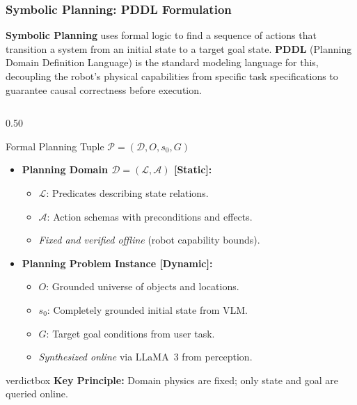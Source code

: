 \documentclass[10pt]{beamer}
\begin{document}
\begin{frame}[t]
\frametitle{Symbolic Planning: PDDL Formulation}
\footnotesize
\textbf{Symbolic Planning} uses formal logic to find a sequence of actions that transition a system from an initial state to a target goal state. \textbf{PDDL} (Planning Domain Definition Language) is the standard modeling language for this, decoupling the robot's physical capabilities from specific task specifications to guarantee causal correctness before execution.

\vspace{0.15cm}
\begin{columns}[T]
        \begin{column}{0.50\textwidth}
        \begin{block}{Formal Planning Tuple $\mathcal{P} = (\mathcal{D}, O, s_0, G)$}
            \begin{itemize}\scriptsize
                \item \textbf{Planning Domain $\mathcal{D} = (\mathcal{L}, \mathcal{A})$ [Static]:}
                \begin{itemize}\tiny
                    \item $\mathcal{L}$: Predicates describing state relations.
                    \item $\mathcal{A}$: Action schemas with preconditions and effects.
                    \item \textit{Fixed and verified offline} (robot capability bounds).
                \end{itemize}
                \vspace{0.06cm}
                \item \textbf{Planning Problem Instance [Dynamic]:}
                \begin{itemize}\tiny
                    \item $O$: Grounded universe of objects and locations.
                    \item $s_0$: Completely grounded initial state from VLM.
                    \item $G$: Target goal conditions from user task.
                    \item \textit{Synthesized online} via LLaMA~3 from perception.
                \end{itemize}
            \end{itemize}
        \end{block}
        
        \vspace{0.12cm}
        \begin{beamercolorbox}[sep=4pt,center,shadow=true,rounded=true]{verdictbox}
            \tiny \textbf{Key Principle:} Domain physics are fixed; only state and goal are queried online.
        \end{beamercolorbox}
    \end{column}
    

\end{columns}
\end{frame}
\end{document}
